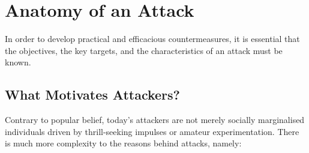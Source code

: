 \section{Anatomy of an Attack}

In order to develop practical and efficacious countermeasures, it is essential that the objectives, the key targets, and the characteristics of an attack must be known.

\subsection{What Motivates Attackers?}

Contrary to popular belief, today's attackers are not merely socially marginalised individuals driven by thrill-seeking impulses or amateur experimentation. There is much more complexity to the reasons behind attacks, namely:

